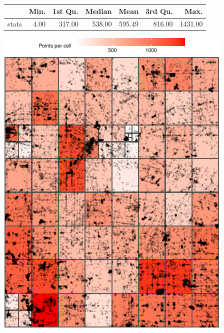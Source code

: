 \documentclass[
  9pt,
  landscape]{article}
\begin{document}
\begin{minipage}{0.5\textwidth} 
\centering 
\begin{tabular}{rrrrrrr}
  \hline
 & Min. & 1st Qu. & Median & Mean & 3rd Qu. & Max. \\ 
  \hline
stats & 4.00 & 317.00 & 538.00 & 595.49 & 816.00 & 1431.00 \\ 
   \hline
\end{tabular}
\vspace{0.5cm} 


\includegraphics[width=1\linewidth,height=0.8\textheight]{distance_files/figure-latex/p1_318_1500_4-1} 

\end{minipage} 
\end{document}
